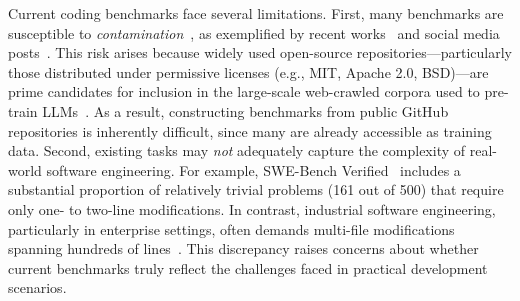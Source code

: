 Current coding benchmarks face several limitations. First, many benchmarks are susceptible to \emph{contamination}~\cite{xu2024benchmark, deng2024investigating, Zhang2024ACE, White2024LiveBenchAC}, as exemplified by recent works~\cite{xu2024benchmark,deng2024investigating,cheng2025survey} and social media posts~\cite{aleithan2024swe,zhang2025swebench}. This risk arises because widely used open-source repositories—particularly those distributed under permissive licenses (e.g., MIT, Apache 2.0, BSD)—are prime candidates for inclusion in the large-scale web-crawled corpora used to pre-train LLMs~\cite{brown2020language}. As a result, constructing benchmarks from public GitHub repositories is inherently difficult, since many are already accessible as training data. Second, existing tasks may \emph{not} adequately capture the complexity of real-world software engineering. For example, SWE-Bench Verified~\cite{jimenez2024swebench} includes a substantial proportion of relatively trivial problems (161 out of 500) that require only one- to two-line modifications. In contrast, industrial software engineering, particularly in enterprise settings, often demands multi-file modifications spanning hundreds of lines~\cite{hassan2009predicting,steidl2017evaluating}. This discrepancy raises concerns about whether current benchmarks truly reflect the challenges faced in practical development scenarios.







